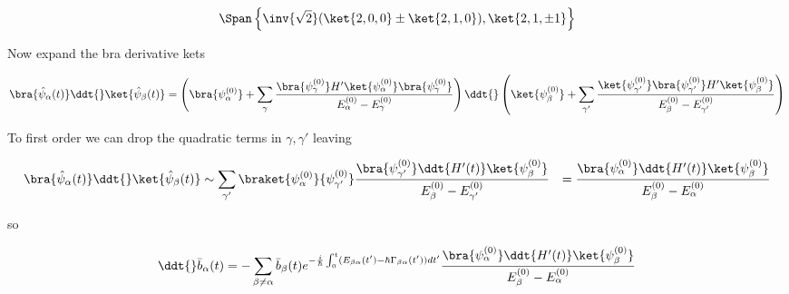 \begin{equation}\label{eqn:qmTwoR3:490}
\Span \left\{
\inv{\sqrt{2}}( \ket{2,0,0} \pm \ket{2,1,0} ), \ket{2, 1, \pm 1}
\right\}
\end{equation}

Now expand the bra derivative kets

\begin{equation}\label{eqn:qmTwoR3:510}
\bra{\hat{\psi}_\alpha(t)}
\ddt{} \ket{\hat{\psi}_\beta(t)}
=
\left(
\bra{\psi_{\alpha}^{(0)}} 
+\sum_{\gamma} \frac{ 
\bra{\psi_\gamma^{(0)}} H' \ket{\psi_\alpha^{(0)}} 
\bra{\psi_\gamma^{(0)}} 
}{
E_\alpha^{(0)} 
-E_\gamma^{(0)} 
}
\right)
\ddt{}
\left(
\ket{\psi_{\beta}^{(0)}} 
+\sum_{\gamma'} \frac{ 
\ket{\psi_{\gamma'}^{(0)}} 
\bra{\psi_{\gamma'}^{(0)}} H' \ket{\psi_\beta^{(0)}} 
}{
E_\beta^{(0)} 
-E_{\gamma'}^{(0)} 
}
\right)
\end{equation}

To first order we can drop the quadratic terms in $\gamma,\gamma'$ leaving

\begin{equation}\label{eqn:qmTwoR3:530}
\begin{aligned}
\bra{\hat{\psi}_\alpha(t)}
\ddt{} \ket{\hat{\psi}_\beta(t)}
&\sim
\sum_{\gamma'} 
\braket{\psi_{\alpha}^{(0)}}{\psi_{\gamma'}^{(0)}} 
\frac{ 
\bra{\psi_{\gamma'}^{(0)}} \ddt{H'(t)} \ket{\psi_\beta^{(0)}} 
}{
E_\beta^{(0)} 
-E_{\gamma'}^{(0)} 
}
&=
\frac{ 
\bra{\psi_{\alpha}^{(0)}} \ddt{H'(t)} \ket{\psi_\beta^{(0)}} 
}{
E_\beta^{(0)} 
-E_{\alpha}^{(0)} 
}
\end{aligned}
\end{equation}

so

\begin{equation}\label{eqn:qmTwoR3:550}
\ddt{}\bar{b}_\alpha(t)
=
-\sum_{\beta \ne \alpha} \bar{b}_\beta(t)
e^{-\frac{i}{\hbar} \int_0^t (E_{\beta\alpha}(t') - \hbar \Gamma_{\beta\alpha}(t')) dt'}
\frac{ 
\bra{\psi_{\alpha}^{(0)}} \ddt{H'(t)} \ket{\psi_\beta^{(0)}} 
}{
E_\beta^{(0)} 
-E_{\alpha}^{(0)} 
}
\end{equation}


\EndNoBibArticle
